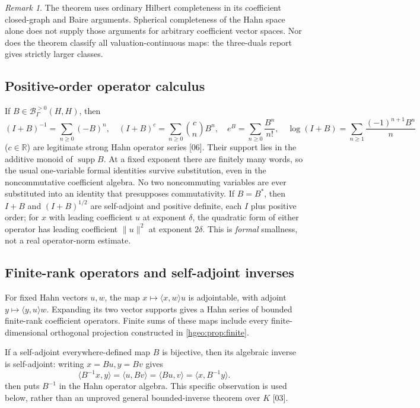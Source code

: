 \documentclass[11pt,letterpaper]{article}
\numberwithin{equation}{section}
\theoremstyle{definition}
\theoremstyle{remark}
\newtheorem{remark}[remark]{Remark}
\newcommand{\R}{\mathbb R}
\newcommand{\K}{K}
\newcommand{\Bpos}[2]{\mathscr B^{>0}_\Gamma(#1,#2)}
\newcommand{\supp}{\operatorname{supp}}
\newcommand{\ip}[2]{\langle #1,#2\rangle}
\newcommand{\norm}[1]{\lVert #1\rVert}
\newcommand{\src}[1]{\textup{\textsf{\small[#1]}}}
\begin{document}
\begin{remark}
The theorem uses ordinary Hilbert completeness in its coefficient
closed-graph and Baire arguments. Spherical completeness of the Hahn
space alone does not supply those arguments for arbitrary coefficient
vector spaces. Nor does the theorem classify all valuation-continuous
maps: the three-duals report gives strictly larger classes.
\end{remark}

\subsection{Positive-order operator calculus}\label{hgeo:sub:calculus}
If $B\in\Bpos{H}{H}$, then
\begin{equation}\label{hgeo:eq:formalcalculus}
 (I+B)^{-1}=\sum_{n\ge0}(-B)^n,
 \quad (I+B)^c=\sum_{n\ge0}\binom cn B^n,
 \quad e^B=\sum_{n\ge0}\frac{B^n}{n!},
 \quad \log(I+B)=\sum_{n\ge1}\frac{(-1)^{n+1}B^n}{n}
\end{equation}
($c\in\R$) are legitimate strong Hahn operator series \src{06}. Their support
lies in the additive monoid of $\supp B$. At a fixed exponent there are
finitely many words, so the usual one-variable formal identities survive
substitution, even in the noncommutative coefficient algebra. No two
noncommuting variables are ever substituted into an identity that presupposes
commutativity. If $B=B^*$, then $I+B$ and $(I+B)^{1/2}$ are self-adjoint and
positive definite, each $I$ plus positive order; for $x$ with leading
coefficient $u$ at exponent $\delta$, the quadratic form of either operator
has leading coefficient $\norm u^2$ at exponent $2\delta$. This is
\emph{formal} smallness, not a real operator-norm estimate.

\subsection{Finite-rank operators and self-adjoint inverses}
For fixed Hahn vectors $u,w$, the map $x\mapsto\ip{x}{w}u$ is
adjointable, with adjoint $y\mapsto\ip{y}{u}w$. Expanding its two
vector supports gives a Hahn series of bounded finite-rank coefficient
operators. Finite sums of these maps include every finite-dimensional
orthogonal projection constructed in \cref{hgeo:prop:finite}.

If a self-adjoint everywhere-defined map $B$ is bijective, then its
algebraic inverse is self-adjoint: writing $x=Bu,y=Bv$ gives
\[
 \ip{B^{-1}x}{y}=\ip{u}{Bv}=\ip{Bu}{v}
 =\ip{x}{B^{-1}y}.
\]
 then puts $B^{-1}$ in the Hahn operator
algebra. This specific observation is used below, rather than an unproved
general bounded-inverse theorem over $\K$ \src{03}.
\end{document}
